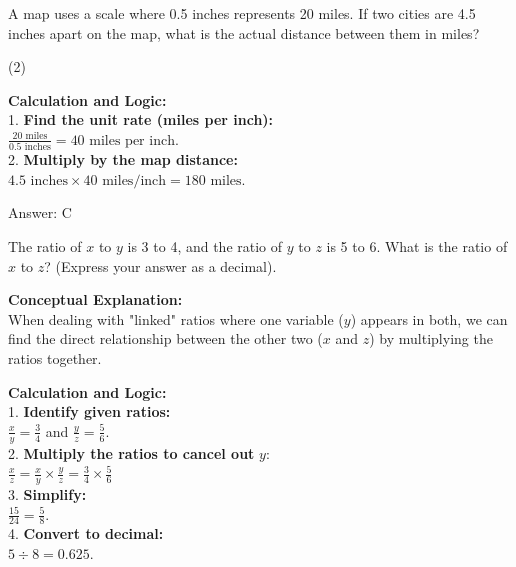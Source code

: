 \documentclass[11pt,paper=a4,answers]{exam}
\begin{document}
\begin{questions}
\vspace{60pt}

\question
A map uses a scale where 0.5 inches represents 20 miles. If two cities are 4.5 inches apart on the map, what is the actual distance between them in miles?
\begin{tasks}(2)
\end{tasks}

\begin{solution}
\textbf{Calculation and Logic:} \\
1. \textbf{Find the unit rate (miles per inch):} \\
$\frac{20 \text{ miles}}{0.5 \text{ inches}} = 40 \text{ miles per inch}$. \\
2. \textbf{Multiply by the map distance:} \\
$4.5 \text{ inches} \times 40 \text{ miles/inch} = 180 \text{ miles}$.

\vspace{30pt}

Answer: \colorbox{yellow!100}{C}
\end{solution}

\vspace{60pt}

\question
The ratio of $x$ to $y$ is 3 to 4, and the ratio of $y$ to $z$ is 5 to 6. What is the ratio of $x$ to $z$? (Express your answer as a decimal).

\begin{solution}
\textbf{Conceptual Explanation:} \\
When dealing with "linked" ratios where one variable ($y$) appears in both, we can find the direct relationship between the other two ($x$ and $z$) by multiplying the ratios together.

\vspace{30pt}

\textbf{Calculation and Logic:} \\
1. \textbf{Identify given ratios:} \\
$\frac{x}{y} = \frac{3}{4}$ and $\frac{y}{z} = \frac{5}{6}$. \\
2. \textbf{Multiply the ratios to cancel out } $y$: \\
$\frac{x}{z} = \frac{x}{y} \times \frac{y}{z} = \frac{3}{4} \times \frac{5}{6}$ \\
3. \textbf{Simplify:} \\
$\frac{15}{24} = \frac{5}{8}$. \\
4. \textbf{Convert to decimal:} \\
$5 \div 8 = 0.625$.


\end{solution}
\end{questions}
\end{document}
